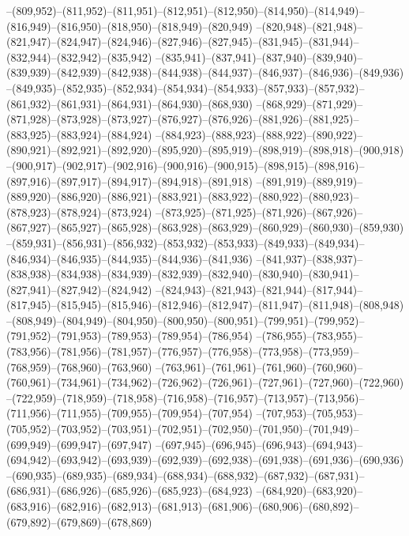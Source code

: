 --(809,952)--(811,952)--(811,951)--(812,951)--(812,950)--(814,950)--(814,949)--(816,949)--(816,950)--(818,950)--(818,949)--(820,949)
--(820,948)--(821,948)--(821,947)--(824,947)--(824,946)--(827,946)--(827,945)--(831,945)--(831,944)--(832,944)--(832,942)--(835,942)
--(835,941)--(837,941)--(837,940)--(839,940)--(839,939)--(842,939)--(842,938)--(844,938)--(844,937)--(846,937)--(846,936)--(849,936)
--(849,935)--(852,935)--(852,934)--(854,934)--(854,933)--(857,933)--(857,932)--(861,932)--(861,931)--(864,931)--(864,930)--(868,930)
--(868,929)--(871,929)--(871,928)--(873,928)--(873,927)--(876,927)--(876,926)--(881,926)--(881,925)--(883,925)--(883,924)--(884,924)
--(884,923)--(888,923)--(888,922)--(890,922)--(890,921)--(892,921)--(892,920)--(895,920)--(895,919)--(898,919)--(898,918)--(900,918)
--(900,917)--(902,917)--(902,916)--(900,916)--(900,915)--(898,915)--(898,916)--(897,916)--(897,917)--(894,917)--(894,918)--(891,918)
--(891,919)--(889,919)--(889,920)--(886,920)--(886,921)--(883,921)--(883,922)--(880,922)--(880,923)--(878,923)--(878,924)--(873,924)
--(873,925)--(871,925)--(871,926)--(867,926)--(867,927)--(865,927)--(865,928)--(863,928)--(863,929)--(860,929)--(860,930)--(859,930)
--(859,931)--(856,931)--(856,932)--(853,932)--(853,933)--(849,933)--(849,934)--(846,934)--(846,935)--(844,935)--(844,936)--(841,936)
--(841,937)--(838,937)--(838,938)--(834,938)--(834,939)--(832,939)--(832,940)--(830,940)--(830,941)--(827,941)--(827,942)--(824,942)
--(824,943)--(821,943)--(821,944)--(817,944)--(817,945)--(815,945)--(815,946)--(812,946)--(812,947)--(811,947)--(811,948)--(808,948)
--(808,949)--(804,949)--(804,950)--(800,950)--(800,951)--(799,951)--(799,952)--(791,952)--(791,953)--(789,953)--(789,954)--(786,954)
--(786,955)--(783,955)--(783,956)--(781,956)--(781,957)--(776,957)--(776,958)--(773,958)--(773,959)--(768,959)--(768,960)--(763,960)
--(763,961)--(761,961)--(761,960)--(760,960)--(760,961)--(734,961)--(734,962)--(726,962)--(726,961)--(727,961)--(727,960)--(722,960)
--(722,959)--(718,959)--(718,958)--(716,958)--(716,957)--(713,957)--(713,956)--(711,956)--(711,955)--(709,955)--(709,954)--(707,954)
--(707,953)--(705,953)--(705,952)--(703,952)--(703,951)--(702,951)--(702,950)--(701,950)--(701,949)--(699,949)--(699,947)--(697,947)
--(697,945)--(696,945)--(696,943)--(694,943)--(694,942)--(693,942)--(693,939)--(692,939)--(692,938)--(691,938)--(691,936)--(690,936)
--(690,935)--(689,935)--(689,934)--(688,934)--(688,932)--(687,932)--(687,931)--(686,931)--(686,926)--(685,926)--(685,923)--(684,923)
--(684,920)--(683,920)--(683,916)--(682,916)--(682,913)--(681,913)--(681,906)--(680,906)--(680,892)--(679,892)--(679,869)--(678,869)
